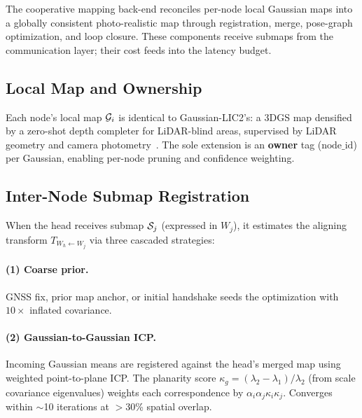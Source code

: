 \label{sec:mapping}

The cooperative mapping back-end reconciles per-node local Gaussian maps
into a globally consistent photo-realistic map through registration, merge,
pose-graph optimization, and loop closure. These components receive submaps
from the communication layer; their cost feeds into the latency budget.

\subsection{Local Map and Ownership}

\label{sec:local}

Each node's local map $\mathcal{G}_i$ is identical to Gaussian-LIC2's: a
3DGS map densified by a zero-shot depth completer for LiDAR-blind areas,
supervised by LiDAR geometry and camera photometry~\cite{lang2026gaussian2}.
The sole extension is an \textbf{owner} tag ($\text{node\_id}$) per Gaussian,
enabling per-node pruning and confidence weighting.

\subsection{Inter-Node Submap Registration}

\label{sec:registration}

When the head receives submap $\mathcal{S}_j$ (expressed in $W_j$), it estimates
the aligning transform $T_{W_h\leftarrow W_j}$ via three cascaded strategies:

\paragraph{(1) Coarse prior.} GNSS fix, prior map anchor, or initial handshake
seeds the optimization with $10\times$ inflated covariance.

\paragraph{(2) Gaussian-to-Gaussian ICP.} Incoming Gaussian means are registered
against the head's merged map using weighted point-to-plane ICP. The planarity
score $\kappa_g=(\lambda_2-\lambda_1)/\lambda_2$ (from scale covariance
eigenvalues) weights each correspondence by $\alpha_i\alpha_j\kappa_i\kappa_j$.
Converges within $\sim$10 iterations at $>$30\% spatial overlap.

